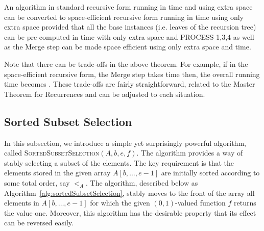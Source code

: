 \begin{theorem}
An algorithm in standard recursive form running in  time and using  extra space can be converted
to space-efficient recursive form running in  time using only  extra space provided that all the base instances
(i.e. leaves of the recursion tree) can be pre-computed in  time with only  extra
space and PROCESS 1,3,4 as well as the Merge step can be made
space efficient using only  extra space and  time.
\end{theorem}

Note that there can be trade-offs in the above theorem. For example, if in the space-efficient recursive form, the Merge step takes
 time then, the overall running time becomes . These trade-offs are fairly straightforward, related to the
Master Theorem for Recurrences \cite{cormen:alg} and can be adjusted to each situation.

\subsection{Sorted Subset Selection}

In this subsection, we introduce a simple yet surprisingly powerful
algorithm, called \textsc{SortedSubsetSelection}$(A,b,e,f)$.  The
algorithm provides a way of stably selecting a subset of the elements.
The key requirement is that the elements stored in the given array
$A[b,\ldots, e-1]$ are initially sorted according to some total order,
say $<_{A}$. The algorithm, described below as
Algorithm~\ref{alg:sortedSubsetSelection}, stably moves to the front
of the array all elements in $A[b,\ldots, e-1]$ for which the given
$(0,1)$-valued function $f$ returns the value one.  Moreover, this
algorithm has the desirable property that its effect can be reversed
easily.

